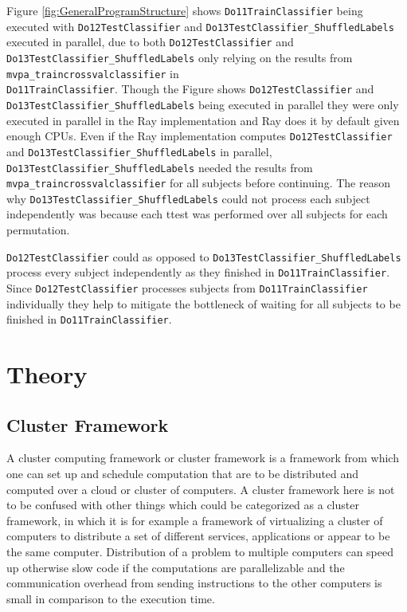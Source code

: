 \documentclass[12pt, a4paper]{article}
\begin{document}
Figure \ref{fig:GeneralProgramStructure} shows \texttt{Do11TrainClassifier} being executed with \texttt{Do12TestClassifier} and \texttt{Do13TestClassifier\_ShuffledLabels} executed in parallel, due to both \texttt{Do12TestClassifier} and \texttt{Do13TestClassifier\_ShuffledLabels} only relying on the results from \texttt{mvpa\_traincrossvalclassifier} in\\
\texttt{Do11TrainClassifier}.
Though the Figure shows \texttt{Do12TestClassifier} and \texttt{Do13TestClassifier\_ShuffledLabels} being executed in parallel they were only executed in parallel in the Ray implementation and Ray does it by default given enough CPUs.
Even if the Ray implementation computes \texttt{Do12TestClassifier} and \texttt{Do13TestClassifier\_ShuffledLabels} in parallel, \texttt{Do13TestClassifier\_ShuffledLabels} needed the results from \texttt{mvpa\_traincrossvalclassifier} for all subjects before continuing.
The reason why \texttt{Do13TestClassifier\_ShuffledLabels} could not process each subject independently was because each ttest was performed over all subjects for each permutation.

\texttt{Do12TestClassifier} could as opposed to \texttt{Do13TestClassifier\_ShuffledLabels} process every subject independently as they finished in \texttt{Do11TrainClassifier}.
Since \texttt{Do12TestClassifier} processes subjects from \texttt{Do11TrainClassifier} individually they help to mitigate the bottleneck of waiting for all subjects to be finished in \texttt{Do11TrainClassifier}.
 

\section{Theory}

\subsection{Cluster Framework}

A cluster computing framework or cluster framework is a framework from which one can set up and schedule computation that are to be distributed and computed over a cloud or cluster of computers.
A cluster framework here is not to be confused with other things which could be categorized as a cluster framework, in which it is for example a framework of virtualizing a cluster of computers to distribute a set of different services, applications or appear to be the same computer.
Distribution of a problem to multiple computers can speed up otherwise slow code if the computations are parallelizable and the communication overhead from sending instructions to the other computers is small in comparison to the execution time.
\end{document}

